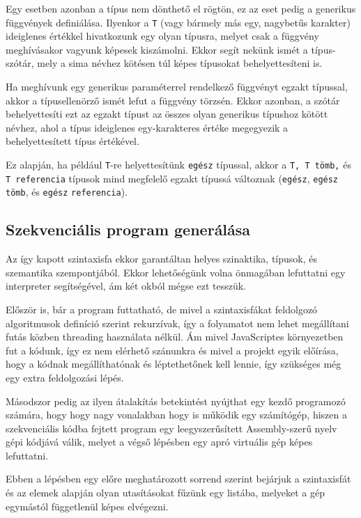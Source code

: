 Egy esetben azonban a típus nem dönthető el rögtön, ez az eset pedig a generikus függvények definiálása. Ilyenkor a \texttt{T} (vagy bármely más egy, nagybetűs karakter) ideiglenes értékkel hivatkozunk egy olyan típusra, melyet csak a függvény meghívásakor vagyunk képesek kiszámolni. Ekkor segít nekünk ismét a típus-szótár, mely a sima névhez kötésen túl képes típusokat behelyettesíteni is.

Ha meghívunk egy generikus paraméterrel rendelkező függvényt egzakt típussal, akkor a típusellenörző ismét lefut a függvény törzsén. Ekkor azonban, a szótár behelyettesíti ezt az egzakt típust az összes olyan generikus típushoz kötött névhez, ahol a típus ideiglenes egy-karakteres értéke megegyezik a behelyettesített típus értékével.

Ez alapján, ha például \texttt{T}-re helyettesítünk \texttt{egész} típussal, akkor a \texttt{T, T tömb,} és \texttt{T referencia} típusok mind megfelelő egzakt típussá változnak (\texttt{egész}, \texttt{egész} \texttt{tömb}, és \texttt{egész} \texttt{referencia}).

\subsection{Szekvenciális program generálása}

Az így kapott szintaxisfa ekkor garantáltan helyes szinaktika, típusok, és szemantika szempontjából. Ekkor lehetőségünk volna önmagában lefuttatni egy interpreter segítségével, ám két okból mégse ezt tesszük.

Először is, bár a program futtatható, de mivel a szintaxisfákat feldolgozó algoritmusok definíció szerint rekurzívak, így a folyamatot nem lehet megállítani futás közben threading használata nélkül. Ám mivel JavaScriptes környezetben fut a kódunk, így ez nem elérhető szánunkra és mivel a projekt egyik előírása, hogy a kódnak megállíthatónak és léptethetőnek kell lennie, így szükséges még egy extra feldolgozási lépés.

Másodszor pedig az ilyen átalakítás betekintést nyújthat egy kezdő programozó számára, hogy hogy nagy vonalakban hogy is működik egy számítógép, hiszen a szekvenciális kódba fejtett program egy leegyszerűsített Assembly-szerű nyelv gépi kódjává válik, melyet a végső lépésben egy apró virtuális gép képes lefuttatni.

Ebben a lépésben egy előre meghatározott sorrend szerint bejárjuk a szintaxisfát és az elemek alapján olyan utasításokat fűzünk egy listába, melyeket a gép egymástól függetlenül képes elvégezni.

